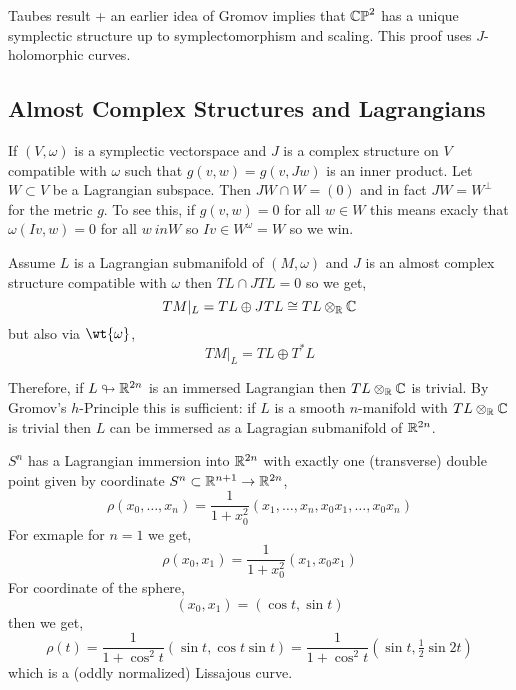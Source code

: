 \documentclass[12pt]{article}
\begin{document}
\begin{rmk}
Taubes result + an earlier idea of Gromov implies that $\mathbb{CP}^2$ has a unique symplectic structure up to symplectomorphism and scaling. This proof uses $J$-holomorphic curves. 
\end{rmk}

\subsection{Almost Complex Structures and Lagrangians}

If $(V, \omega)$ is a symplectic vectorspace and $J$ is a complex structure on $V$ compatible with $\omega$ such that $g(v,w) = g(v, Jw)$ is an inner product. Let $W \subset V$ be a Lagrangian subspace. Then $J W \cap W = (0)$ and in fact $J W = W^\perp$ for the metric $g$. To see this, if $g(v,w) = 0$ for all $w \in W$ this means exacly that $\omega(Iv, w) = 0$ for all $w\ in W$ so $I v \in W^\omega = W$ so we win. 

\begin{cor}
Assume $L$ is a Lagrangian submanifold of $(M, \omega)$ and $J$ is an almost complex structure compatible with $\omega$ then $T L \cap J TL = 0$ so we get,
\[ TM |_L = TL \oplus J TL \cong TL \otimes_{\mathbb{R}} \mathbb{C} \]
but also via $\wt{\omega}$,
\[ TM |_L = TL \oplus T^*L \]
\end{cor}

\newcommand{\immersed}{\looparrowright}

\begin{rmk}
Therefore, if $L \immersed \R^{2n}$ is an immersed Lagrangian then $T L \otimes_{\mathbb{R}} \mathbb{C}$ is trivial. By Gromov's $h$-Principle this is sufficient: if $L$ is a smooth $n$-manifold with $T L \otimes_{\mathbb{R}} \mathbb{C}$ is trivial then $L$ can be immersed as a Lagragian submanifold of $\mathbb{R}^{2n}$.
\end{rmk}

\begin{example}
$S^n$ has a Lagrangian immersion into $\mathbb{R}^{2n}$ with exactly one (transverse) double point given by coordinate $S^n \subset \mathbb{R}^{n+1} \to \mathbb{R}^{2n}$,
\[ \rho(x_0, \dots, x_n) = \frac{1}{1 + x_0^2} (x_1, \dots, x_n, x_0 x_1, \dots, x_0 x_n) \]
For exmaple for $n = 1$ we get,
\[ \rho(x_0, x_1) = \frac{1}{1 + x_0^2}(x_1, x_0 x_1) \]
For coordinate of the sphere, 
\[ (x_0, x_1) = (\cos{t}, \sin{t}) \]
then we get,
\[ \rho(t) = \frac{1}{1 + \cos^2{t}} (\sin{t}, \cos{t} \sin{t}) = \frac{1}{1 + \cos^2{t}} (\sin{t}, \tfrac{1}{2} \sin{2t}) \]
which is a (oddly normalized) Lissajous curve. 
\end{example}
\end{document}
